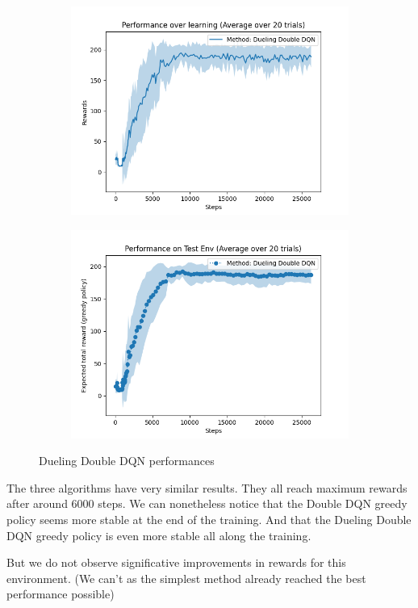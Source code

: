 \documentclass[a4paper]{article}
\begin{document}
\begin{figure}[h!]
    \centering
    \begin{subfigure}[b]{0.4\linewidth}
        \includegraphics[width=\linewidth]{images/dddqn_l}
    \end{subfigure}
    \begin{subfigure}[b]{0.4\linewidth}
        \includegraphics[width=\linewidth]{images/dddqn_t}
    \end{subfigure}
    \caption{Dueling Double DQN performances}
    \label{fig:dddqn}
\end{figure}

The three algorithms have very similar results. They all reach maximum rewards after around 6000 steps. We can nonetheless notice that the Double DQN
greedy policy seems more stable at the end of the training. And that the Dueling Double DQN greedy policy is even more stable all along the training.

But we do not observe significative improvements in rewards for this environment. (We can't as the simplest method already reached the best performance
possible)



\end{document}
